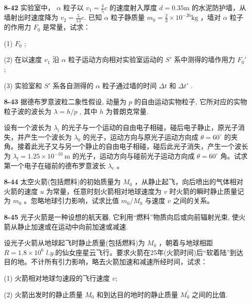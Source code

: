 \newpage

\textbf{8-42} 实验室中， $\alpha$ 粒子以 $v_{1} = \frac{4}{5} c$ 的速度射入厚度 $d = 0.35\mathrm{m}$ 的水泥防护墙，从墙射出时速度降为 $v_{2} = \frac{5}{13} c.$ 已知 $\alpha$ 粒子静质量 $m_0 = \frac{2}{3} \times 10^{-26}\mathrm{kg}$ ，墙对 $\alpha$ 粒子的作用力 $F_{0}$ 是常量，试求：

(1) $F_{0}$ ;

(2) 在以速度 $v_{1}$ 沿 $\alpha$ 粒子运动方向相对实验室运动的 $S'$ 系中测得的墙作用力 $F_{0}'$ ;

(3) 实验室和 $S'$ 系各自测得的 $\alpha$ 粒子通过墙的时间 $\Delta t$ 和 $\Delta t'$ .

\newpage

\textbf{8-43} 据德布罗意波粒二象性假设, 动量为 $p$ 的自由运动实物粒子, 它所对应的实物粒子波的波长为 $\lambda = h/p$ , 其中 $h$ 为普朗克常量.

设有一个波长为 $\lambda_{\mathrm{i}}$ 的光子与一个运动的自由电子相碰，碰后电子静止，原光子消失，并产生一个波长为 $\lambda_0$ 的光子，运动方向与原光子运动方向成 $\theta = 60^{\circ}$ 的夹角。接着此光子又与另一个静止的自由电子相碰，碰后此光子消失，产生一个波长为 $\lambda_{\mathrm{f}} = 1.25 \times 10^{-10} \mathrm{~m}$ 的光子，运动方向与碰前光子运动方向成 $\theta = 60^{\circ}$ 角。试求第一个电子在碰前的德布罗意波长 $\lambda_{\mathrm{e}}$ 。

\newpage

\textbf{8-44} 太空火箭(包括燃料)的初始质量为 $M_{0}$ ，从静止起飞，向后喷出的气体相对火箭的速度 $u$ 为常量，任意时刻火箭相对地球速度为 $v$ 时火箭的瞬时静止质量记为 $m_{0}$ 。忽略地球引力影响，试求比值 $m_{0}/M_{0}$ 与速度 $v$ 之间的关系。

\newpage

\textbf{8-45} 光子火箭是一种设想的航天器, 它利用“燃料”物质向后或向前辐射光束, 使火箭从静止加速或在运动中向前加速或减速.

设光子火箭从地球起飞时静止质量(包括燃料)为 $M_{0}$ ，朝着与地球相距 $R=1.8\times10^{6}$ $l$.$y$.的仙女座星云飞行。要求火箭在25年(火箭时间)后“软着陆”到达目的地。不计所有引力影响，略去火箭加速和减速所经时间，试求：

(1) 火箭相对地球匀速段的飞行速度 $v$;

(2) 火箭出发时的静止质量 $M_{0}$ 和到达目的地时的静止质量 $M_{0}^{\prime}$ 之间的比值.

\newpage

